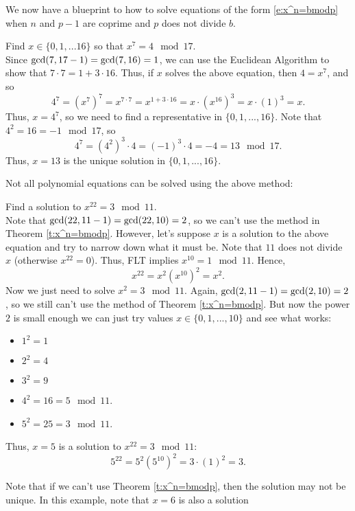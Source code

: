 \documentclass[11pt,dvipsnames]{book}
\def\gcd{{\rm gcd}}
\numberwithin{equation}{section} %
\numberwithin{figure}{section} %
\numberwithin{table}{section} %
\begin{document}
We now have a blueprint to how to solve equations of the form \eqref{e:x^n=bmodp} when $n$ and $p-1$ are coprime and $p$ does not divide $b$. 

\begin{example}
 Find $x\in\{0,1,...16\}$ so that $ x^{7} = 4\mod 17$.  \\

Since $\gcd(7,17-1)=\gcd(7,16)=1$, we can use the Euclidean Algorithm to show that $7\cdot 7=1+3\cdot 16$.  Thus, if $x$ solves the above equation, then $4 = x^{7}$,   and so
\[
4^{7} = (x^{7})^{7}  
= x^{7\cdot 7}  
= x^{1+3\cdot 16} 
 = x\cdot (x^{16})^{3} 
   = x\cdot (1)^{3} 
   = x.
\] 
Thus, $x = 4^{7}$, so we need to find a representative in $\{0,1,...,16\}$. Note that $4^{2}=16 = -1\mod 17$,  so 
\[
4^{7}=(4^{2})^{3} \cdot 4
 = (-1)^{3} \cdot 4
=-4 = 13\mod 17. 
\] 
Thus, $x=13$ is the unique solution in $\{0,1,...,16\}$. 
\end{example}



Not all polynomial equations can be solved using the above method:
 

\begin{example}
Find a solution to $x^{22} = 3 \mod 11$.  \\

Note that $\gcd(22,11-1)=\gcd(22,10)=2$, so we can't use the method in Theorem \ref{t:x^n=bmodp}. However, let's suppose $x$ is a solution to the above equation and try to narrow down what it must be. Note that $11$ does not divide $x$   (otherwise $x^{22} = 0$).  Thus, FLT implies $x^{10} = 1 \mod 11$. Hence, 
\[
x^{22}=x^{2}(x^{10})^{2}   = x^{2}.\]  
Now we just need to solve $x^{2} = 3 \mod 11$.  Again, $\gcd(2,11-1)=\gcd(2,10)=2$, so we still can't use the method of Theorem \ref{t:x^n=bmodp}.  But now the power $2$ is small enough we can just try values $x\in \{0,1,...,10\}$ and see what works: 

\begin{itemize}
\item $1^{2}=1$ 
\item $2^{2}=4$ 
\item $3^{2}=9$ 
\item $4^{2}=16 = 5 \mod 11$.  
\item $5^{2}=25 = 3\mod 11$.  
\end{itemize}
Thus, $x=5$ is a solution to $x^{22} = 3 \mod 11$:  
\[
5^{22}=5^{2}(5^{10})^{2} = 3\cdot (1)^{2}=3.
\]

Note that if we can't use Theorem \ref{t:x^n=bmodp}, then the solution may not be unique. In this example, note that $x=6$ is also a solution
\end{example}
\end{document}
